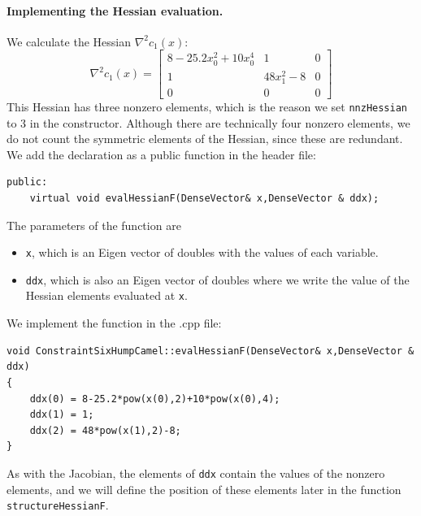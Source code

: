 \paragraph{Implementing the Hessian evaluation.} We calculate the Hessian $\nabla^2 c_1(x)$:
\begin{equation}
\nabla^2 c_1(x) = \begin{bmatrix} 8 - 25.2x_0^2 + 10x_0^4 & 1 & 0 \\ 1 & 48x_1^2 - 8 & 0 \\ 0 & 0 & 0 \end{bmatrix} \label{eqn:shcb_hessian}
\end{equation}
This Hessian has three nonzero elements, which is the reason we set \texttt{nnzHessian} to 3 in the constructor. Although there are technically four nonzero elements, we do not count the symmetric elements of the Hessian, since these are redundant. We add the declaration as a public function in the header file:
\begin{lstlisting}
public:
	virtual void evalHessianF(DenseVector& x,DenseVector & ddx);
\end{lstlisting}
The parameters of the function are
\begin{itemize}
\item
\texttt{x}, which is an Eigen vector of doubles with the values of each variable.
\item
\texttt{ddx}, which is also an Eigen vector of doubles where we write the value of the Hessian elements evaluated at \texttt{x}.
\end{itemize}
We implement the function in the .cpp file:
\begin{lstlisting}
void ConstraintSixHumpCamel::evalHessianF(DenseVector& x,DenseVector & ddx)
{
	ddx(0) = 8-25.2*pow(x(0),2)+10*pow(x(0),4);
    ddx(1) = 1;
    ddx(2) = 48*pow(x(1),2)-8;
}
\end{lstlisting}
As with the Jacobian, the elements of \texttt{ddx} contain the values of the nonzero elements, and we will define the position of these elements later in the function \texttt{structureHessianF}.


